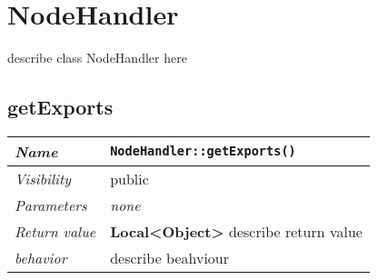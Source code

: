 \chapter{NodeHandler}
describe class NodeHandler here
\section{getExports}
\begin{longtable}{p{3cm} @{\hskip 1cm} p{12cm}}
 \hline
\textit{Name} & \texttt{NodeHandler::getExports()}\\
\hline
 \textit{Visibility} & public\\
\hline
\textit{Parameters} & \textit{none}\\
\hline
\textit{Return value} & \textbf{ Local<Object>} describe return value\\
  \hline
 \textit{behavior} & describe beahviour \\
\hline
\end{longtable} \pagebreak
 